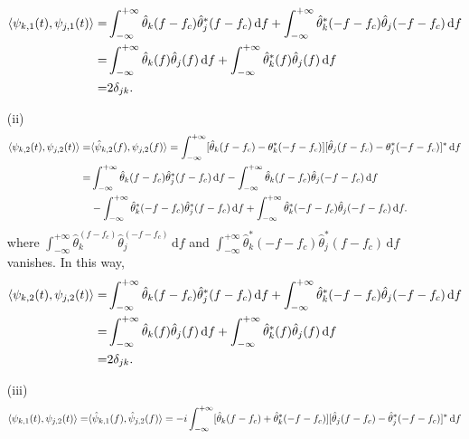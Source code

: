 \documentclass{assignment}
\begin{document}
\begin{sol}
\begin{itemize}
        \begin{align}
            \notag\langle\psi_{k,1}(t),\psi_{j,1}(t)\rangle=&\int_{-\infty}^{+\infty}\hat{\theta}_k(f-f_c)\hat{\theta}_j^*(f-f_c)\,\mathrm{d}f+\int_{-\infty}^{+\infty}\hat{\theta}_k^*(-f-f_c)\hat{\theta}_j(-f-f_c)\,\mathrm{d}f\\
            \notag=&\int_{-\infty}^{+\infty}\hat{\theta}_k(f)\hat{\theta}_j(f)\,\mathrm{d}f+\int_{-\infty}^{+\infty}\hat{\theta}_k^*(f)\hat{\theta}_j(f)\,\mathrm{d}f\\
            =&2\delta_{jk}.
        \end{align}
        \item[(ii)] 
        \begin{align}
            \notag\langle\psi_{k,2}(t),\psi_{j,2}(t)\rangle=&\langle\hat{\psi}_{k,2}(f),\psi_{j,2}(f)\rangle=\int_{-\infty}^{+\infty}[\hat{\theta}_k(f-f_c)-\theta_k^*(-f-f_c)][\hat{\theta}_j(f-f_c)-\theta_j^*(-f-f_c)]^*\,\mathrm{d}f\\
            \notag=&\int_{-\infty}^{+\infty}\hat{\theta}_k(f-f_c)\hat{\theta}_j^*(f-f_c)\,\mathrm{d}f-\int_{-\infty}^{+\infty}\hat{\theta}_k(f-f_c)\hat{\theta}_j(-f-f_c)\,\mathrm{d}f\\
            &-\int_{-\infty}^{+\infty}\hat{\theta}_k^*(-f-f_c)\hat{\theta}_j^*(f-f_c)\,\mathrm{d}f+\int_{-\infty}^{+\infty}\hat{\theta}_k^*(-f-f_c)\hat{\theta}_j(-f-f_c)\,\mathrm{d}f.
        \end{align}
        where $\int_{-\infty}^{+\infty}\hat{\theta}_k^(f-f_c)\hat{\theta}_j^(-f-f_c)\,\mathrm{d}f$ and $\int_{-\infty}^{+\infty}\hat{\theta}_k^*(-f-f_c)\hat{\theta}_j^*(f-f_c)\,\mathrm{d}f$ vanishes. In this way,
        \begin{align}
            \notag\langle\psi_{k,2}(t),\psi_{j,2}(t)\rangle=&\int_{-\infty}^{+\infty}\hat{\theta}_k(f-f_c)\hat{\theta}_j^*(f-f_c)\,\mathrm{d}f+\int_{-\infty}^{+\infty}\hat{\theta}_k^*(-f-f_c)\hat{\theta}_j(-f-f_c)\,\mathrm{d}f\\
            \notag=&\int_{-\infty}^{+\infty}\hat{\theta}_k(f)\hat{\theta}_j(f)\,\mathrm{d}f+\int_{-\infty}^{+\infty}\hat{\theta}_k^*(f)\hat{\theta}_j(f)\,\mathrm{d}f\\
            =&2\delta_{jk}.
        \end{align}
        \item[(iii)] 
        \begin{align}
            \notag\langle\psi_{k,1}(t),\psi_{j,2}(t)\rangle=&\langle\hat{\psi}_{k,1}(f),\hat{\psi}_{j,2}(f)\rangle=-i\int_{-\infty}^{+\infty}[\hat{\theta}_k(f-f_c)+\hat{\theta}_k^*(-f-f_c)][\hat{\theta}_j(f-f_c)-\hat{\theta}_j^*(-f-f_c)]^*\,\mathrm{d}f\\

\end{align}
\end{itemize}
\end{sol}
\end{document}
